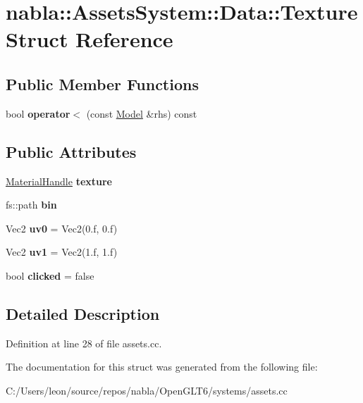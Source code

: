 \hypertarget{structnabla_1_1_assets_system_1_1_data_1_1_texture}{}\section{nabla\+::Assets\+System\+::Data\+::Texture Struct Reference}
\label{structnabla_1_1_assets_system_1_1_data_1_1_texture}
\subsection*{Public Member Functions}
\begin{DoxyCompactItemize}
\item 
\mbox{\label{structnabla_1_1_assets_system_1_1_data_1_1_texture_ab3ae918b4ae28ad4036e6b2ef0145eac}} 
bool {\bfseries operator$<$} (const \mbox{\hyperlink{structnabla_1_1_assets_system_1_1_data_1_1_model}{Model}} \&rhs) const
\end{DoxyCompactItemize}
\subsection*{Public Attributes}
\begin{DoxyCompactItemize}
\item 
\mbox{\label{structnabla_1_1_assets_system_1_1_data_1_1_texture_a95d865d9c5c2e0ec2e92712aab9ab086}} 
\mbox{\hyperlink{classnabla_1_1renderer_1_1_handle}{Material\+Handle}} {\bfseries texture}
\item 
\mbox{\label{structnabla_1_1_assets_system_1_1_data_1_1_texture_afc239d15e81210d52e18cba742b8d49e}} 
fs\+::path {\bfseries bin}
\item 
\mbox{\label{structnabla_1_1_assets_system_1_1_data_1_1_texture_af4be03df8ce656bf49947d54e5e3467e}} 
Vec2 {\bfseries uv0} = Vec2(0.f, 0.f)
\item 
\mbox{\label{structnabla_1_1_assets_system_1_1_data_1_1_texture_a03c31faa0ce0298177fdcf3f06af7d9b}} 
Vec2 {\bfseries uv1} = Vec2(1.f, 1.f)
\item 
\mbox{\label{structnabla_1_1_assets_system_1_1_data_1_1_texture_acd92e69ca5e698afc3f533d201c59ca7}} 
bool {\bfseries clicked} = false
\end{DoxyCompactItemize}


\subsection{Detailed Description}


Definition at line 28 of file assets.\+cc.



The documentation for this struct was generated from the following file\+:\begin{DoxyCompactItemize}
\item 
C\+:/\+Users/leon/source/repos/nabla/\+Open\+G\+L\+T6/systems/assets.\+cc\end{DoxyCompactItemize}
